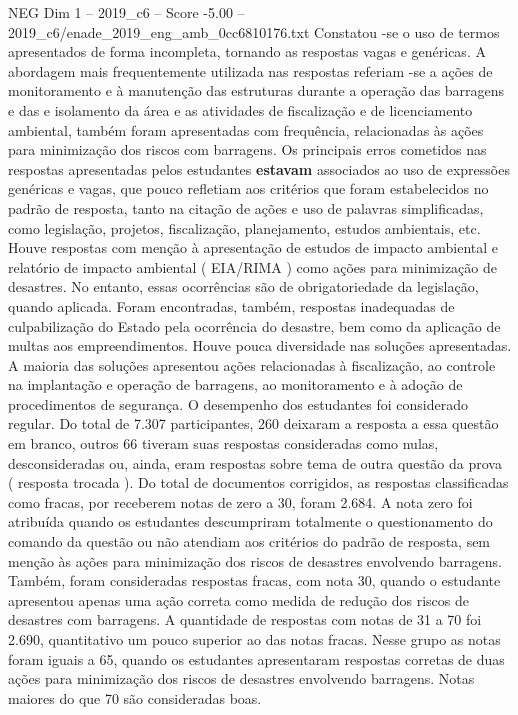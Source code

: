 \begin{textsample}{NEG Dim 1 – 2019\_c6 – Score -5.00 – 2019\_c6/enade\_2019\_eng\_amb\_0cc6810176.txt}
Constatou -se o uso de termos apresentados de forma incompleta, tornando as respostas vagas e genéricas.
A abordagem mais frequentemente utilizada nas respostas referiam -se a ações de monitoramento e à manutenção das estruturas durante a operação das barragens e das e isolamento da área e as atividades de fiscalização e de licenciamento ambiental, também foram apresentadas com frequência, relacionadas às ações para minimização dos riscos com barragens.
Os principais erros cometidos nas respostas apresentadas pelos estudantes \textbf{estavam} associados ao uso de expressões genéricas e vagas, que pouco refletiam aos critérios que foram estabelecidos no padrão de resposta, tanto na citação de ações e uso de palavras simplificadas, como legislação, projetos, fiscalização, planejamento, estudos ambientais, etc.
Houve respostas com menção à apresentação de estudos de impacto ambiental e relatório de impacto ambiental ( EIA/RIMA ) como ações para minimização de desastres.
No entanto, essas ocorrências são de obrigatoriedade da legislação, quando aplicada.
Foram encontradas, também, respostas inadequadas de culpabilização do Estado pela ocorrência do desastre, bem como da aplicação de multas aos empreendimentos.
Houve pouca diversidade nas soluções apresentadas.
A maioria das soluções apresentou ações relacionadas à fiscalização, ao controle na implantação e operação de barragens, ao monitoramento e à adoção de procedimentos de segurança.
O desempenho dos estudantes foi considerado regular.
Do total de 7.307 participantes, 260 deixaram a resposta a essa questão em branco, outros 66 tiveram suas respostas consideradas como nulas, desconsideradas ou, ainda, eram respostas sobre tema de outra questão da prova ( resposta trocada ).
Do total de documentos corrigidos, as respostas classificadas como fracas, por receberem notas de zero a 30, foram 2.684.
A nota zero foi atribuída quando os estudantes descumpriram totalmente o questionamento do comando da questão ou não atendiam aos critérios do padrão de resposta, sem menção às ações para minimização dos riscos de desastres envolvendo barragens.
Também, foram consideradas respostas fracas, com nota 30, quando o estudante apresentou apenas uma ação correta como medida de redução dos riscos de desastres com barragens.
A quantidade de respostas com notas de 31 a 70 foi 2.690, quantitativo um pouco superior ao das notas fracas.
Nesse grupo as notas foram iguais a 65, quando os estudantes apresentaram respostas corretas de duas ações para minimização dos riscos de desastres envolvendo barragens.
Notas maiores do que 70 são consideradas boas.

\end{textsample}
